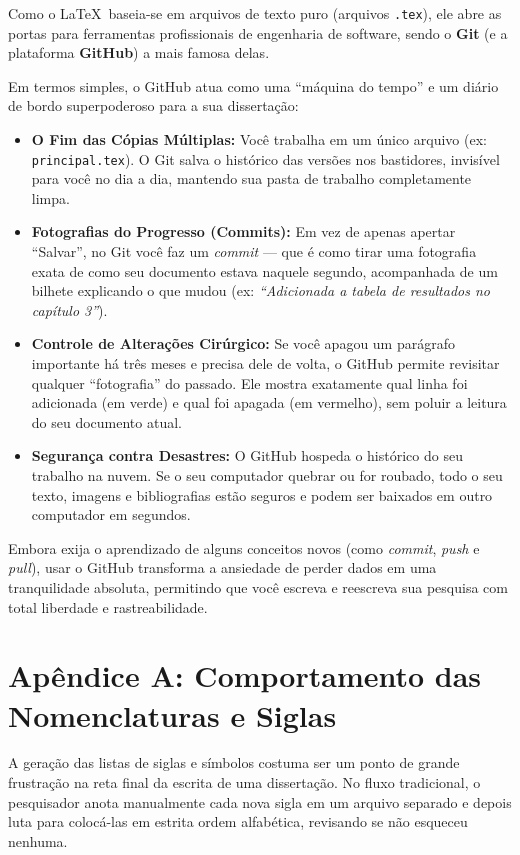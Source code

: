 \documentclass[a4paper,12pt]{article}
\begin{document}
Como o \LaTeX \ baseia-se em arquivos de texto puro (arquivos \texttt{.tex}), ele abre as portas para ferramentas profissionais de engenharia de software, sendo o \textbf{Git} (e a plataforma \textbf{GitHub}) a mais famosa delas. 

Em termos simples, o GitHub atua como uma ``máquina do tempo'' e um diário de bordo superpoderoso para a sua dissertação:

\begin{itemize}
    \item \textbf{O Fim das Cópias Múltiplas:} Você trabalha em um único arquivo (ex: \texttt{principal.tex}). O Git salva o histórico das versões nos bastidores, invisível para você no dia a dia, mantendo sua pasta de trabalho completamente limpa.
    \item \textbf{Fotografias do Progresso (Commits):} Em vez de apenas apertar ``Salvar'', no Git você faz um \textit{commit} — que é como tirar uma fotografia exata de como seu documento estava naquele segundo, acompanhada de um bilhete explicando o que mudou (ex: \textit{``Adicionada a tabela de resultados no capítulo 3''}). 
    \item \textbf{Controle de Alterações Cirúrgico:} Se você apagou um parágrafo importante há três meses e precisa dele de volta, o GitHub permite revisitar qualquer ``fotografia'' do passado. Ele mostra exatamente qual linha foi adicionada (em verde) e qual foi apagada (em vermelho), sem poluir a leitura do seu documento atual.
    \item \textbf{Segurança contra Desastres:} O GitHub hospeda o histórico do seu trabalho na nuvem. Se o seu computador quebrar ou for roubado, todo o seu texto, imagens e bibliografias estão seguros e podem ser baixados em outro computador em segundos.
\end{itemize}

Embora exija o aprendizado de alguns conceitos novos (como \textit{commit}, \textit{push} e \textit{pull}), usar o GitHub transforma a ansiedade de perder dados em uma tranquilidade absoluta, permitindo que você escreva e reescreva sua pesquisa com total liberdade e rastreabilidade.

\section{Apêndice A: Comportamento das Nomenclaturas e Siglas}

A geração das listas de siglas e símbolos costuma ser um ponto de grande frustração na reta final da escrita de uma dissertação. No fluxo tradicional, o pesquisador anota manualmente cada nova sigla em um arquivo separado e depois luta para colocá-las em estrita ordem alfabética, revisando se não esqueceu nenhuma.
\end{document}
